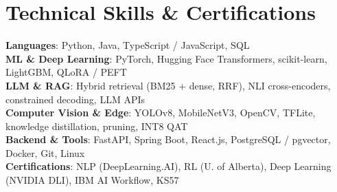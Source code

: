 \documentclass[letterpaper,11pt]{article}
\begin{document}
\section{Technical Skills \& Certifications}
 \begin{itemize}[leftmargin=0.15in, label={}]
    \small{\item{
     \textbf{Languages}{: Python, Java, TypeScript / JavaScript, SQL} \\
     \textbf{ML \& Deep Learning}{: PyTorch, Hugging Face Transformers, scikit-learn, LightGBM, QLoRA / PEFT} \\
     \textbf{LLM \& RAG}{: Hybrid retrieval (BM25 + dense, RRF), NLI cross-encoders, constrained decoding, LLM APIs} \\
     \textbf{Computer Vision \& Edge}{: YOLOv8, MobileNetV3, OpenCV, TFLite, knowledge distillation, pruning, INT8 QAT} \\
     \textbf{Backend \& Tools}{: FastAPI, Spring Boot, React.js, PostgreSQL / pgvector, Docker, Git, Linux} \\
     \textbf{Certifications}{: NLP (DeepLearning.AI), RL (U. of Alberta), Deep Learning (NVIDIA DLI), IBM AI Workflow, KS57}
    }}
 \end{itemize}
\end{document}
